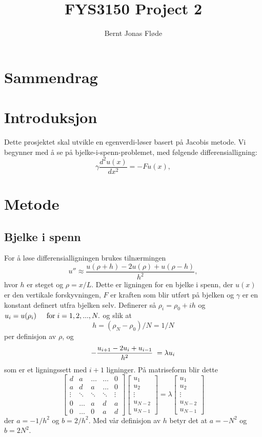 \documentclass[a4paper,10pt,english]{article}
\title{FYS3150 Project 2
}
\author{Bernt Jonas Fløde
}
\begin{document}
\maketitle



\section*{Sammendrag}

\section*{Introduksjon}
Dette prosjektet skal utvikle en egenverdi-løser basert på Jacobis metode.
Vi begynner med å se på bjelke-i-spenn-problemet, med følgende
differensialligning:
$$\gamma \frac{d^2 u(x)}{dx^2} = -F u(x),$$

\section*{Metode}
\subsection*{Bjelke i spenn}
For å løse differensialligningen brukes tilnærmingen
$$u'' \approx \frac{u(\rho+h) -2u(\rho) +u(\rho-h)}{h^2},$$
hvor $h$ er steget og $\rho = x/L$. Dette er ligningen for en bjelke i spenn,
der $u(x)$ er den vertikale forskyvningen, $F$ er kraften som blir utført på
bjelken og $\gamma$ er en konstant definert utfra bjelken selv.
Definerer så $\rho_i=\rho_0+i h$ og $u_i=u(\rho_i) \hspace{0.5cm} \mathrm{for} \hspace{0.1cm} i=1,2,...,N.$ og slik at
$$h = (\rho_N-\rho_0)/N = 1/N$$
per definisjon av $\rho$, og
$$-\frac{u_{i+1} -2u_i +u_{i-1} }{h^2}\hspace{0.1cm}= \lambda u_i$$
som er et ligningssett med $i+1$ ligninger. På matriseform blir dette
\[
\begin{bmatrix}
     d    & a     & \dots&\dots & 0    \\
     a    & d     & a    & \dots& 0    \\
    \vdots&\ddots &\ddots&\ddots&\vdots\\
     0    &\dots  & a    & d    & a    \\
     0    &\dots  & 0    & a    & d
\end{bmatrix}
\begin{bmatrix}
    u_1 \\ u_2 \\ \vdots \\ u_{N-2} \\ u_{N-1}
\end{bmatrix}
=
\lambda
\begin{bmatrix}
    u_1 \\ u_2 \\ \vdots \\ u_{N-2} \\ u_{N-1}
\end{bmatrix}
\]
der $a = -1/h^2$ og $b = 2/h^2$. Med vår definisjon av $h$ betyr det at
$a = -N^2$ og $b = 2 N^2$.
\end{document}
